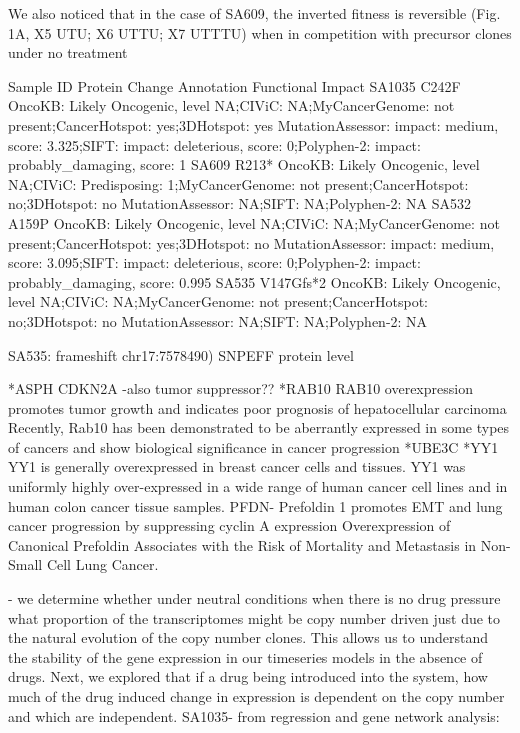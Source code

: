 We also noticed that in the case of SA609, the inverted fitness is reversible (Fig. 1A, X5 UTU; X6 UTTU; X7 UTTTU) when in competition with precursor clones under no treatment

Sample ID	Protein Change	Annotation	Functional Impact
SA1035	C242F	OncoKB: Likely Oncogenic, level NA;CIViC: NA;MyCancerGenome: not present;CancerHotspot: yes;3DHotspot: yes	MutationAssessor: impact: medium, score: 3.325;SIFT: impact: deleterious, score: 0;Polyphen-2: impact: probably\_damaging, score: 1
SA609	R213*	OncoKB: Likely Oncogenic, level NA;CIViC: Predisposing: 1;MyCancerGenome: not present;CancerHotspot: no;3DHotspot: no	MutationAssessor: NA;SIFT: NA;Polyphen-2: NA
SA532	A159P	OncoKB: Likely Oncogenic, level NA;CIViC: NA;MyCancerGenome: not present;CancerHotspot: yes;3DHotspot: no	MutationAssessor: impact: medium, score: 3.095;SIFT: impact: deleterious, score: 0;Polyphen-2: impact: probably\_damaging, score: 0.995
SA535	V147Gfs*2	OncoKB: Likely Oncogenic, level NA;CIViC: NA;MyCancerGenome: not present;CancerHotspot: no;3DHotspot: no	MutationAssessor: NA;SIFT: NA;Polyphen-2: NA


SA535: frameshift chr17:7578490) SNPEFF protein level

*ASPH \cite{li2018expression, hou2018recent, kanwal2020aspartate, lin2019asph}
CDKN2A \cite{shahidsales2018genetic}-also tumor suppressor??
*RAB10 \cite{wang2017rab10}RAB10 overexpression promotes tumor growth and indicates poor prognosis of hepatocellular carcinoma
Recently, Rab10 has been demonstrated to be aberrantly expressed in some types of cancers and show biological significance in cancer progression \cite{he2002identification, jiang2016mir}
*UBE3C \cite{xiong2019mir, pan2015ubiquitin, zhang2020ube3c}
*YY1 \cite{wan2012yin, chinnappan2009transcription, meliala2020biological} 
YY1 is generally overexpressed in breast cancer cells and tissues.
YY1 was uniformly highly over-expressed in a wide range of human cancer cell lines and in human colon cancer tissue samples.
PFDN-   Prefoldin 1 promotes EMT and lung cancer progression by suppressing cyclin A expression
Overexpression of Canonical Prefoldin Associates with the Risk of Mortality and Metastasis in Non-Small Cell Lung Cancer. 

- we determine whether under neutral conditions when there is no drug pressure what proportion of the transcriptomes might be copy number driven just due to the natural evolution of the copy number clones. This allows us to understand the stability of the gene expression in our timeseries models in the absence of drugs. 
 Next, we explored that if a drug being introduced into the system, how much of the drug induced change in expression is dependent on the copy number and which are independent.
SA1035- from regression and gene network analysis:

